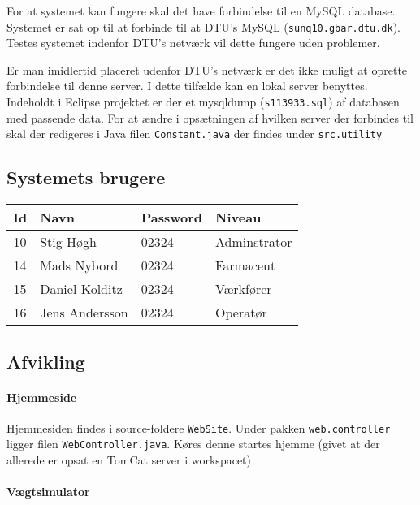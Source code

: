 \documentclass[a4paper]{article}
\begin{document}
For at systemet kan fungere skal det have forbindelse til en MySQL database. Systemet er sat op til at forbinde til at DTU's MySQL (\texttt{sunq10.gbar.dtu.dk}). Testes systemet indenfor DTU's netværk vil dette fungere uden problemer.

Er man imidlertid placeret udenfor DTU's netværk er det ikke muligt at oprette forbindelse til denne server. I dette tilfælde kan en lokal server benyttes. Indeholdt i Eclipse projektet er der et mysqldump (\texttt{s113933.sql}) af databasen med passende data. For at ændre i opsætningen af hvilken server der forbindes til skal der redigeres i Java filen \texttt{Constant.java} der findes under \texttt{src.utility}

\subsection*{Systemets brugere} %

\begin{tabular}{c l l l}
  Id & Navn & Password & Niveau \\
  \hline
  10 & Stig Høgh & 02324 & Adminstrator \\
  14 & Mads Nybord & 02324 & Farmaceut \\
  15 & Daniel Kolditz & 02324 & Værkfører \\
  16 & Jens Andersson & 02324 & Operatør \\
\end{tabular}


\subsection*{Afvikling} %

\paragraph{Hjemmeside} %

Hjemmesiden findes i source-foldere \texttt{WebSite}. Under pakken \texttt{web.controller} ligger filen \texttt{WebController.java}. Køres denne startes hjemme (givet at der allerede er opsat en TomCat server i workspacet)


\paragraph{Vægtsimulator} %
\end{document}
